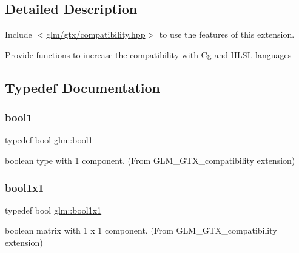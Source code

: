 \subsection{Detailed Description}
Include $<$\hyperlink{compatibility_8hpp}{glm/gtx/compatibility.\+hpp}$>$ to use the features of this extension.

Provide functions to increase the compatibility with Cg and H\+L\+SL languages 

\subsection{Typedef Documentation}
\mbox{\label{group__gtx__compatibility_gab65f19f5170f95a2f06d6aa6482c9405}} 
\subsubsection{\texorpdfstring{bool1}{bool1}}
{\footnotesize\ttfamily typedef bool \hyperlink{group__gtx__compatibility_gab65f19f5170f95a2f06d6aa6482c9405}{glm\+::bool1}}



boolean type with 1 component. (From G\+L\+M\+\_\+\+G\+T\+X\+\_\+compatibility extension) 

\mbox{\label{group__gtx__compatibility_ga98d9d3da22aebc872ba38ce5afa0eff7}} 
\subsubsection{\texorpdfstring{bool1x1}{bool1x1}}
{\footnotesize\ttfamily typedef bool \hyperlink{group__gtx__compatibility_ga98d9d3da22aebc872ba38ce5afa0eff7}{glm\+::bool1x1}}



boolean matrix with 1 x 1 component. (From G\+L\+M\+\_\+\+G\+T\+X\+\_\+compatibility extension) 

\mbox{\label{group__gtx__compatibility_ga19e8114c90e2c81cfa87db72f4020b52}} 
